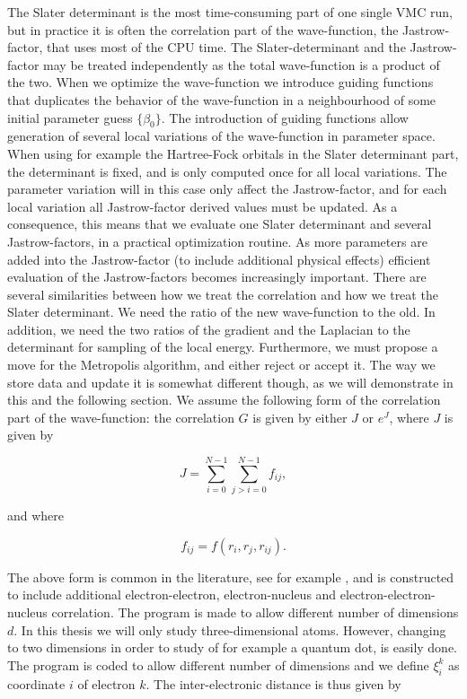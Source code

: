 The Slater determinant is the most time-consuming part of one single
VMC run, but in practice it is often the correlation part of the 
wave-function, the Jastrow-factor, that uses most of the CPU time. 
The Slater-determinant and the Jastrow-factor may be treated 
independently as the total wave-function is a product of the two. When
we optimize the wave-function we introduce guiding functions that
duplicates the behavior of the wave-function in a neighbourhood of
some initial parameter guess $\{ \beta_0\}$. The introduction of
guiding functions allow generation of several local variations
of the wave-function in parameter space. When using for
example the Hartree-Fock orbitals in the Slater determinant part, the
determinant is fixed, and is only computed once for all local
variations. The parameter variation will in this case only affect 
the Jastrow-factor, and for each local variation all Jastrow-factor
derived values must be updated. As a consequence, this means that we
evaluate one Slater determinant and several Jastrow-factors, in a
practical optimization routine. As more parameters are added into the
Jastrow-factor (to include additional physical effects) efficient
evaluation of the Jastrow-factors becomes increasingly important.
\newline
%
\newline
There are several similarities between how we treat the
correlation and how we treat the Slater determinant. We need the ratio
of the new wave-function to the old. In addition, we need the two
ratios of the gradient and the Laplacian to the determinant for
sampling of the local energy. 
Furthermore, we must propose a move for the Metropolis
algorithm, and either reject or accept it. The way we store data and
update it is somewhat different though, as we will demonstrate in this
and the following section. 
\newline
%
\newline
We assume the following form of the correlation part of the
wave-function: the correlation $G$ is given by either $J$ or $e^J$,
where $J$ is given by

\begin{equation}
  J = \sum_{i=0}^{N-1}\sum_{j > i=0}^{N-1} f_{ij},
\end{equation}

and where

\begin{equation}
  f_{ij} = f(r_i, r_j, r_{ij}).
\end{equation}

The above form is common in the literature, see for example
\cite{hammond1994, kent1999}, and is constructed to include additional 
electron-electron, electron-nucleus and electron-electron-nucleus
correlation.
\newline
%
\newline
The program is made to allow different number of dimensions $d$. In
this thesis we will only study three-dimensional atoms. However,
changing to two dimensions in order to study of for example a quantum
dot, is easily done. The program is coded to allow different number of 
dimensions and we define $\xi_i^k$ as coordinate $i$ of electron
$k$. The inter-electronic distance is thus given by

